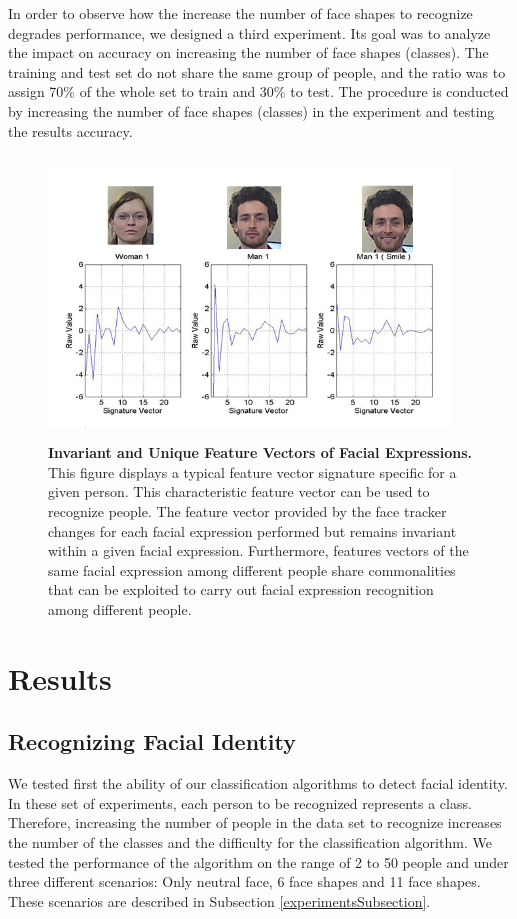 \documentclass[]{article}
\begin{document}
In order to observe how the increase the number of face shapes to recognize degrades performance, we designed a third
experiment. Its goal was to analyze the impact on accuracy on increasing the number of face shapes (classes).  The
training and test set do not share the same group of people, and the ratio was to assign 70\% of the whole set to train
and 30\% to test. The procedure is conducted by increasing the number of face shapes (classes) in the experiment and
testing the results accuracy.

\begin{figure}[ht]
\begin{center}
\vspace{-3mm}
\includegraphics[width=0.95\textwidth,height=75mm]{figures/comparationBetweenFaces2.jpg}
\end{center}
\caption{\textbf{Invariant and Unique Feature Vectors of Facial Expressions.} This figure displays a typical feature 
vector signature specific for a given person. This characteristic feature vector can be used to recognize people. The
feature vector provided by the face tracker changes for each facial expression performed but remains invariant within a
given facial expression. Furthermore, features vectors of the same facial expression among different people share commonalities that
can be exploited to carry out facial expression recognition among different people.}
\label{comparationBetweenFaces}
\end{figure}

\section{Results}

\subsection{Recognizing Facial Identity}
We tested first the ability of our classification algorithms to detect facial identity. In these set of experiments,
each person to be recognized represents a class. Therefore, increasing the number of people in the data set to recognize
increases the number of the classes and the difficulty for the classification algorithm. We tested the performance of
the algorithm on the range of 2 to 50 people and under three different scenarios: Only neutral face, 6 face
shapes and 11 face shapes. These scenarios are described in Subsection \ref{experimentsSubsection}.
\end{document}
